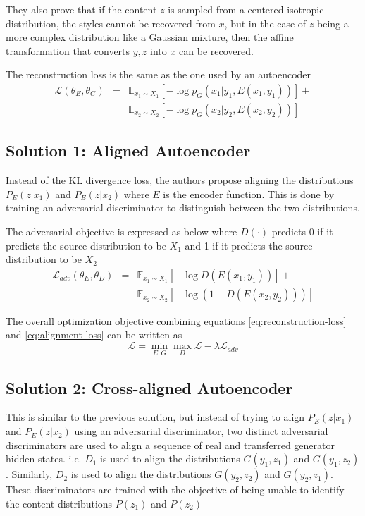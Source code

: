 \documentclass[12pt]{article}
\begin{document}
    They also prove that if the content $z$ is sampled from a centered isotropic distribution, the styles cannot be recovered from $x$, but in the case of $z$ being a more complex distribution like a Gaussian mixture, then the affine transformation that converts $y, z$ into $x$ can be recovered.

    The reconstruction loss is the same as the one used by an autoencoder
    \begin{eqnarray} \label{eq:reconstruction-loss}
      \mathcal{L}(\theta_E,\theta_G) 
        &=& \mathbb{E}_{x_1 \sim X_1}[-\log p_G(x_1|y_1,E(x_1, y_1))] + \nonumber \\
        & & \mathbb{E}_{x_2 \sim X_2}[-\log p_G(x_2|y_2,E(x_2, y_2))]
    \end{eqnarray}

  \subsection{Solution 1: Aligned Autoencoder} \label{aligned-autoencoder}
    Instead of the KL divergence loss, the authors propose aligning the distributions $P_E(z|x_1)$ and $P_E(z|x_2)$ where $E$ is the encoder function. This is done by training an adversarial discriminator to distinguish between the two distributions.

    The adversarial objective is expressed as below where $D(\cdot)$ predicts 0 if it predicts the source distribution to be $X_1$ and 1 if it predicts the source distribution to be $X_2$
    \begin{eqnarray} \label{eq:alignment-loss}
      \mathcal{L}_{adv}(\theta_E,\theta_D) 
        &=& \mathbb{E}_{x_1 \sim X_1}[-\log D(E(x_1,y_1))] + \nonumber \\
        & & \mathbb{E}_{x_2 \sim X_2}[-\log(1 - D(E(x_2,y_2)))]
    \end{eqnarray}

    The overall optimization objective combining equations \ref{eq:reconstruction-loss} and \ref{eq:alignment-loss} can be written as 
    \begin{equation*}
      \mathcal{L} = \operatorname*{min}_{E,G} \operatorname*{max}_{D} \mathcal{L} - \lambda \mathcal{L}_{adv}
    \end{equation*}

  
  \subsection{Solution 2: Cross-aligned Autoencoder}
    This is similar to the previous solution, but instead of trying to align $P_E(z|x_1)$ and $P_E(z|x_2)$ using an adversarial discriminator, two distinct adversarial discriminators are used to align a sequence of real and transferred generator hidden states. i.e. $D_1$ is used to align the distributions $G(y_1, z_1)$ and $G(y_1, z_2)$. Similarly, $D_2$ is used to align the distributions $G(y_2, z_2)$ and $G(y_2, z_1)$. These discriminators are trained with the objective of being unable to identify the content distributions $P(z_1)$ and $P(z_2)$
\end{document}
